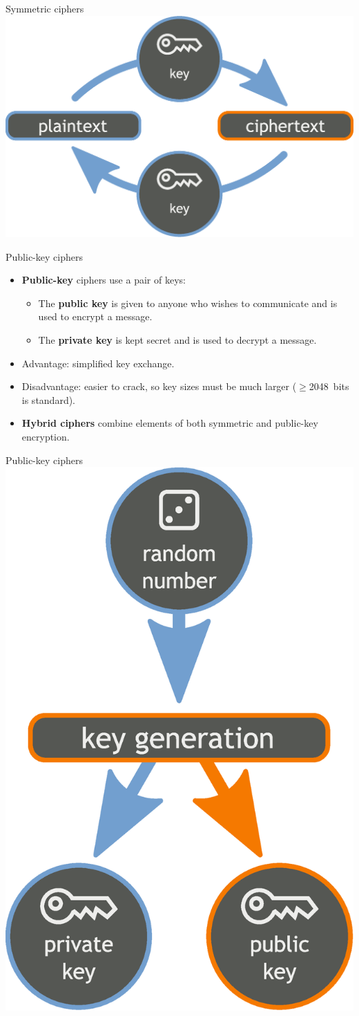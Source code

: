 \documentclass[%
mode=present,%
paper=smartboard,
size=20pt,
]{powerdot}
\begin{document}
\begin{slide}[toc=]{Symmetric ciphers}
\centering\includegraphics[width=0.9\linewidth]{images/Orange_blue_symmetric_cryptography_en}
\end{slide}

\begin{slide}{Public-key ciphers}
  \begin{itemize}
  \item \textbf{Public-key} ciphers use a pair of keys:
    \begin{itemize}
    \item The \textbf{public key} is given to anyone who wishes to
      communicate and is used to encrypt a message.
    \item The \textbf{private key} is kept secret and is used to
      decrypt a message.
    \end{itemize}
  \item Advantage: simplified key exchange.
  \item Disadvantage: easier to crack, so key sizes must be much
    larger ($\geq$2048~bits is standard).
  \item \textbf{Hybrid ciphers} combine elements of both symmetric and
    public-key encryption.
  \end{itemize}
\end{slide}

\begin{slide}[toc=]{Public-key ciphers}
\centering\includegraphics[width=0.35\linewidth]{images/Orange_blue_public_private_keygeneration_en.eps}
\end{slide}
\end{document}
